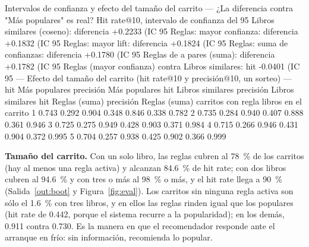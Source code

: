 \documentclass[11pt,letterpaper]{article}
\begin{document}
\begin{consola}[label=out:boot]{Intervalos de confianza y efecto del tamaño del carrito}
--- ¿La diferencia contra "Más populares" es real? Hit rate@10, intervalo de confianza del 95 %
  Libros similares (coseno): diferencia +0.2233 (IC 95 %
  Reglas: mayor confianza: diferencia +0.1832 (IC 95 %
  Reglas: mayor lift: diferencia +0.1824 (IC 95 %
  Reglas: suma de confianzas: diferencia +0.1780 (IC 95 %
  Reglas de a pares (suma): diferencia +0.1782 (IC 95 %
  Reglas (mayor confianza) contra Libros similares: hit -0.0401 (IC 95 %
--- Efecto del tamaño del carrito (hit rate@10 y precisión@10, un sorteo) ---
                      hit Más populares  precisión Más populares  hit Libros similares  precisión Libros similares  hit Reglas (suma)  precisión Reglas (suma)  carritos con regla
libros en el carrito
1                                 0.743                    0.292                 0.904                       0.348              0.846                    0.338               0.782
2                                 0.735                    0.284                 0.940                       0.407              0.888                    0.361               0.946
3                                 0.725                    0.275                 0.949                       0.428              0.903                    0.371               0.984
4                                 0.715                    0.266                 0.946                       0.431              0.904                    0.372               0.995
5                                 0.704                    0.257                 0.938                       0.425              0.902                    0.366               0.999
\end{consola}

\textbf{Tamaño del carrito.} Con un solo libro, las reglas cubren al 78~\% de los carritos (hay al menos una regla activa) y alcanzan 84.6~\% de hit rate; con dos libros cubren al 94.6~\% y con tres o más al 98~\% o más, y el hit rate llega a 90~\% (Salida~\ref{out:boot} y Figura~\ref{fig:eval}). Los carritos sin ninguna regla activa son sólo el 1.6~\% con tres libros, y en ellos las reglas rinden igual que los populares (hit rate de 0.442, porque el sistema recurre a la popularidad); en los demás, 0.911 contra 0.730. Es la manera en que el recomendador responde ante el arranque en frío: sin información, recomienda lo popular.
\end{document}
